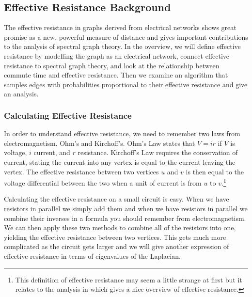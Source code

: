 \documentclass[12pt,twoside]{article}
\begin{document}
\subsection{Effective Resistance Background}

The effective resistance in graphs derived from electrical networks shows great promise as a new, powerful measure of distance and gives important contributions to the analysis of spectral graph theory. In the overview, we will define effective resistance by modelling the graph as an electrical network, connect effective resistance to spectral graph theory, and look at the relationship between commute time and effective resistance. Then we examine an algorithm that samples edges with probabilities proportional to their effective resistance and give an analysis. 

\subsubsection{Calculating Effective Resistance}


In order to understand effective resistance, we need to remember two laws from electromagnetism, Ohm's and Kirchoff's. Ohm's Law states that $V=ir$ if $V$ is voltage, $i$ current, and $r$ resistance. Kirchoff's Law requires the conservation of current, stating the current into any vertex is equal to the current leaving the vertex. The effective resistance between two vertices $u$ and $v$ is then equal to the voltage differential between the two when a unit of current is from $u$ to $v$.\footnote{This definition of effective resistance may seem a little strange at first but it relates to the analysis in \cite{wisc-effective-resistance} which gives a nice overview of effective resistance.}


Calculating the effective resistance on a small circuit is easy. When we have resistors in parallel we simply add them and when we have resistors in parallel we combine their inverses in a formula you should remember from electromagnetism. We can then apply these two methods to combine all of the resistors into one, yielding the effective resistance between two vertices. This gets much more complicated as the circuit gets larger and we will give another expression of effective resistance in terms of eigenvalues of the Laplacian. 
\end{document}
